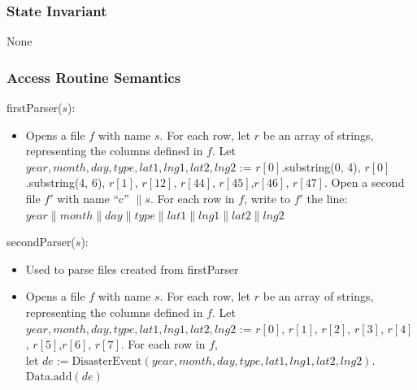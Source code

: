 \documentclass[12pt]{article}
\begin{document}
\subsubsection {State Invariant}

None

\newpage
\subsubsection {Access Routine Semantics}

firstParser($s$):
\begin{itemize}
\item Opens a file $f$ with name $s$. For each row, let $r$ be an array of strings, representing the columns defined in $f$. Let $year, month, day, type, lat1, lng1, lat2, lng2$ := $r[0]$.substring(0, 4), $r[0]$.substring(4, 6), $r[1]$, $r[12]$, $r[44]$, $r[45]$,$r[46]$, $r[47]$. Open a second file $f'$ with name ``c'' $\|s$. For each row in $f$, write to $f'$ the line:\\
$year\|month\|day\|type\|lat1\|lng1\|lat2\|lng2$
\end{itemize}

secondParser($s$):
\begin{itemize}
\item Used to parse files created from firstParser
\item Opens a file $f$ with name $s$. For each row, let $r$ be an array of strings, representing the columns defined in $f$. Let $year, month, day, type, lat1, lng1, lat2, lng2$ := $r[0]$, $r[1]$, $r[2]$, $r[3]$, $r[4]$, $r[5]$,$r[6]$, $r[7]$. For each row in $f$, \\let $de := \mbox{DisasterEvent}(year, month, day, type, lat1, lng1, lat2, lng2)$. 
$\mbox{Data}.\mbox{add}(de)$
\end{itemize}
\end{document}
